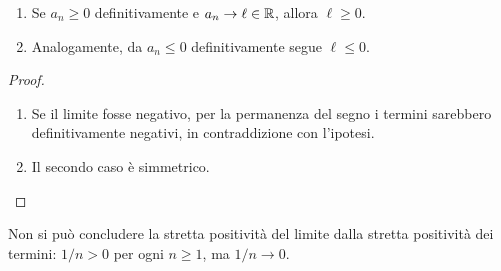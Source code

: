 \begin{corollario}
\begin{enumerate}[label=\arabic*.]
\item Se $a_n\ge0$ definitivamente e $a_n\to\ell\in\mathbb{R}$, allora $\ell\ge0$.
\item Analogamente, da $a_n\le0$ definitivamente segue $\ell\le0$.
\end{enumerate}
\end{corollario}
\begin{proof}
\begin{enumerate}[label=\arabic*.]
\item Se il limite fosse negativo, per la permanenza del segno i termini sarebbero definitivamente negativi, in contraddizione con l'ipotesi.
\item Il secondo caso è simmetrico.
\end{enumerate}
\end{proof}

Non si può concludere la stretta positività del limite dalla stretta positività dei termini: $1/n>0$ per ogni $n\ge1$, ma $1/n\to0$.
